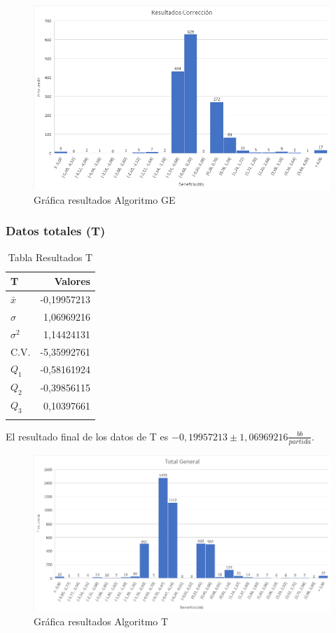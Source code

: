 \vspace{5mm} %

\begin{figure}[h]
\centering
\includegraphics[width=1\textwidth]{figuras/AGC.png}   
\caption{Gráfica resultados Algoritmo GE}
\label{fig:AGC}
\end{figure}


\subsubsection{Datos totales (T)}

\begin{longtable}[c]{lr}
\hline
T & Valores \\ \hline
$\bar{x}$ & -0,19957213 \\ 
$\sigma$ & 1,06969216 \\ 
$\sigma^2$ & 1,14424131 \\ 
C.V. & -5,35992761 \\ 
$Q_1$ & -0,58161924 \\ 
$Q_2$ & -0,39856115 \\ 
$Q_3$ & 0,10397661 \\ \hline
\caption{Tabla Resultados T}
\label{tab:AGT}
\end{longtable}

El resultado final de los datos de T es  $-0,19957213\pm1,06969216$$\frac{bb}{partida}$.


\begin{figure}[h]
\centering
\includegraphics[width=1\textwidth]{figuras/AGT.png}   
\caption{Gráfica resultados Algoritmo T}
\label{fig:AGT}
\end{figure}

